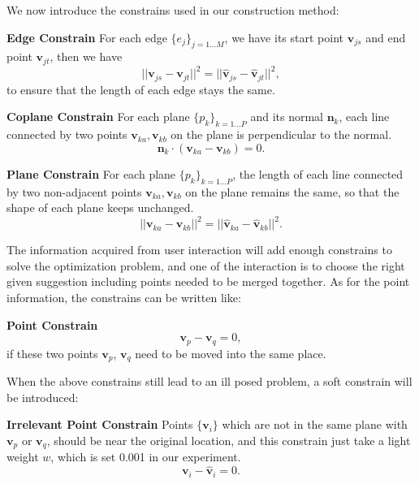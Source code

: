 We now introduce the constrains used in our construction method:

\noindent
\textbf{Edge Constrain} For each edge $\{e_j\}_{j=1...M}$, we have its start point $\mathbf{v}_{js}$ and end point $\mathbf{v}_{jt}$, then we have 
\begin{equation}
||\mathbf{v}_{js} - \mathbf{v}_{jt}||^2 = ||\mathbf{\hat{v}}_{js} - \mathbf{\hat{v}}_{jt}||^2,
\label{equ:edge}
\end{equation}
to ensure that the length of each edge stays the same.

\noindent
\textbf{Coplane Constrain} For each plane $\{p_k\}_{k=1 \dots P}$ and its normal $\mathbf{n}_k$, each line connected by two points $\mathbf{v}_{ka}, \mathbf{v}_{kb}$ on the plane is perpendicular to the normal.
\begin{equation}
\mathbf{n}_k \cdot (\mathbf{v}_{ka} - \mathbf{v}_{kb}) = 0.
\label{equ:coplane}
\end{equation}

\noindent
\textbf{Plane Constrain} For each plane $\{p_k\}_{k=1 \dots P}$, the length of each line connected by two non-adjacent points $\mathbf{v}_{ka}, \mathbf{v}_{kb}$ on the plane remains the same, so that the shape of each plane keeps unchanged.
\begin{equation}
||\mathbf{v}_{ka} - \mathbf{v}_{kb}||^2 = ||\hat{\mathbf{v}}_{ka} - \hat{\mathbf{v}}_{kb}||^2.
\label{equ:plane}
\end{equation}

The information acquired from user interaction will add enough constrains to solve the optimization problem, and one of the interaction is to choose the right given suggestion including points needed to be merged together. As for the point information, the constrains can be written like:

\noindent
\textbf{Point Constrain} 
\begin{equation}
\mathbf{v}_p - \mathbf{v}_q = 0,
\label{equ:point}
\end{equation}
if these two points $\mathbf{v}_p$, $\mathbf{v}_q$ need to be moved into the same place.

When the above constrains still lead to an ill posed problem, a soft constrain will be introduced:

\noindent
\textbf{Irrelevant Point Constrain} Points $\{\mathbf{v}_i\}$ which are not in the same plane with $\mathbf{v}_p$ or $\mathbf{v}_q$, should be near the original location, and this constrain just take a light weight $w$, which is set 0.001 in our experiment. 
\begin{equation}
\mathbf{v}_i - \mathbf{\hat{v}}_i = 0.
\label{equ:irrelevant}
\end{equation}

